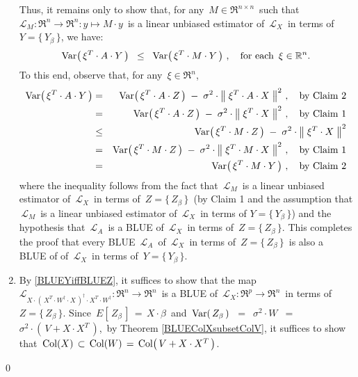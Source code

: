 \begin{enumerate}
	\vskip 0.1cm
	Thus, it remains only to show that, for any \,$M \in \Re^{n \times n}$\, such that
	\,$\mathcal{L}_{M} : \Re^{n} \longrightarrow \Re^{n} : y \longmapsto M \cdot y$\,
	is a linear unbiased estimator of
	\,$\mathcal{L}_{X}$\, in terms of \,$Y = \{\,Y_{\beta}\,\}$,
	we have:
	\begin{equation*}
	\textnormal{Var}\!\left(\,\xi^{T} \cdot A \cdot Y\,\right)
	\;\; \leq \;\;
		\textnormal{Var}\!\left(\,\xi^{T} \cdot M \cdot Y\,\right)\,,
	\quad
	\textnormal{for each \,$\xi \in \mathbb{R}^{n}$}.
	\end{equation*}
	To this end, observe that, for any \,$\xi \in \Re^{n}$,
	\begin{eqnarray*}
	\textnormal{Var}\!\left(\,\xi^{T} \cdot A \cdot Y\,\right)
	& = &
		\textnormal{Var}\!\left(\,\xi^{T} \cdot A \cdot Z\,\right)
		\; - \;
		\sigma^{2} \cdot \left\Vert\; \xi^{T} \cdot A \cdot X \;\right\Vert^{2}\,,
		\quad\textnormal{by Claim 2}
	\\
	& = &
		\textnormal{Var}\!\left(\,\xi^{T} \cdot A \cdot Z\,\right)
		\; - \;
		\sigma^{2} \cdot \left\Vert\; \xi^{T} \cdot X \;\right\Vert^{2}\,,
		\quad\textnormal{by Claim 1}
	\\
	& \leq &
		\textnormal{Var}\!\left(\,\xi^{T} \cdot M \cdot Z\,\right)
		\; - \;
		\sigma^{2} \cdot \left\Vert\; \xi^{T} \cdot X \;\right\Vert^{2}
	\\
	& = &
		\textnormal{Var}\!\left(\,\xi^{T} \cdot M \cdot Z\,\right)
		\; - \;
		\sigma^{2} \cdot \left\Vert\; \xi^{T} \cdot M \cdot X \;\right\Vert^{2}\,,
		\quad\textnormal{by Claim 1}
	\\
	& = &
		\textnormal{Var}\!\left(\,\xi^{T} \cdot M \cdot Y\,\right)\,,
		\quad\textnormal{by Claim 2}
	\end{eqnarray*}
	where the inequality follows from the fact that
	\,$\mathcal{L}_{M}$\, is a linear unbiased estimator of
	\,$\mathcal{L}_{X}$\, in terms of \,$Z = \{\,Z_{\beta}\,\}$\,
	(by Claim 1 and the assumption that \,$\mathcal{L}_{M}$\,
	is a linear unbiased estimator of \,$\mathcal{L}_{X}$\,
	in terms of $Y = \{\,Y_{\beta}\,\}$)
	and the hypothesis that
	\,$\mathcal{L}_{A}$\, is a BLUE of \,$\mathcal{L}_{X}$\,
	in terms of \,$Z = \{\,Z_{\beta}\,\}$.
	This completes the proof that every BLUE \,$\mathcal{L}_{A}$\,
	of \,$\mathcal{L}_{X}$\, in terms of \,$Z = \{\,Z_{\beta}\,\}$\,
	is also a BLUE of
	of \,$\mathcal{L}_{X}$\, in terms of \,$Y = \{\,Y_{\beta}\,\}$.
\item
	By \eqref{BLUEYiffBLUEZ}, it suffices to show that the map
	\,$\mathcal{L}_{X \cdot \left(\,X^{T} \cdot W^{\dagger} \cdot X\,\right)^{\dagger} \cdot X^{T} \cdot W^{\dagger}} : \Re^{n} \longrightarrow \Re^{n}$\,
	is a BLUE of
	\,$\mathcal{L}_{X} : \Re^{p} \longrightarrow \Re^{n}$\, in terms of
	\,$Z = \{\,Z_{\beta}\,\}$.
	Since \,$E\!\left[\,Z_{\beta}\,\right] \,=\, X \cdot \beta$\, and
	\,$\textnormal{Var}\!\left(\,Z_{\beta}\,\right)$
	\,$=$\, $\sigma^{2} \cdot W$
	\,$=$\, $\sigma^{2}\cdot\left(\,V + X \cdot X^{T}\,\right)$,\,
	by Theorem \ref{BLUEColXsubsetColV}, it suffices to show that
	\,$\textnormal{Col}(X) \,\subset\, \textnormal{Col}(W) \,=\, \textnormal{Col}\!\left(\,V + X \cdot X^{T}\,\right)$.
\end{enumerate}
\qed

